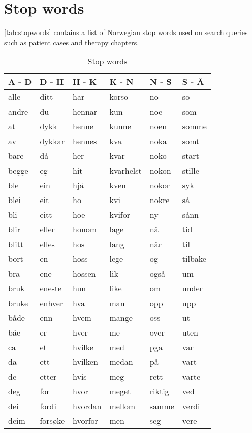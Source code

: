 \chapter{Stop words}
\autoref{tab:stopwords} contains a list of Norwegian stop words used on search queries such as patient cases and therapy chapters.

\begin{table}[htbp] \footnotesize \center
\caption{Stop words\label{tab:stopwords}}
\begin{tabular}{l l l l l l}
    \toprule
    A - D & D - H & H - K & K - N & N - S & S - Å \\
    \midrule
    alle & ditt & har & korso & no & so \\
    andre & du & hennar & kun & noe & som \\
    at & dykk & henne & kunne & noen & somme \\
    av & dykkar & hennes & kva & noka & somt \\
    bare & då & her & kvar & noko & start \\
    begge & eg & hit & kvarhelst & nokon & stille \\
    ble & ein & hjå & kven & nokor & syk \\
    blei & eit & ho & kvi & nokre & så \\
    bli & eitt & hoe & kvifor & ny & sånn \\
    blir & eller & honom & lage & nå & tid \\
    blitt & elles & hos & lang & når & til \\
    bort & en & hoss & lege & og & tilbake \\
    bra & ene & hossen & lik & også & um \\
    bruk & eneste & hun & like & om & under \\
    bruke & enhver & hva & man & opp & upp \\
    både & enn & hvem & mange & oss & ut \\
    båe & er & hver & me & over & uten \\
    ca & et & hvilke & med & pga & var \\
    da & ett & hvilken & medan & på & vart \\
    de & etter & hvis & meg & rett & varte \\
    deg & for & hvor & meget & riktig & ved \\
    dei & fordi & hvordan & mellom & samme & verdi \\
    deim & forsøke & hvorfor & men & seg & vere \\

\end{tabular}
\end{table}
